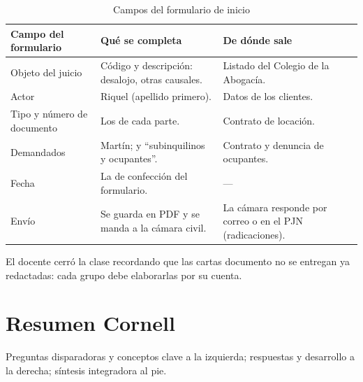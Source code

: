 \documentclass[12pt,oneside]{book}
\begin{document}
\begin{table}[H]
\centering
\caption{Campos del formulario de inicio}
\begin{tabular}{@{}p{3cm}p{5.2cm}p{5.2cm}@{}}
\toprule
\textbf{Campo del formulario} & \textbf{Qué se completa} & \textbf{De dónde sale} \\
\midrule
Objeto del juicio & Código y descripción: desalojo, otras causales. & Listado del Colegio de la Abogacía. \\
Actor & Riquel (apellido primero). & Datos de los clientes. \\
Tipo y número de documento & Los de cada parte. & Contrato de locación. \\
Demandados & Martín; y ``subinquilinos y ocupantes''. & Contrato y denuncia de ocupantes. \\
Fecha & La de confección del formulario. & --- \\
Envío & Se guarda en PDF y se manda a la cámara civil. & La cámara responde por correo o en el PJN (radicaciones). \\
\bottomrule
\end{tabular}
\end{table}

\begin{note}
El docente cerró la clase recordando que las cartas documento no se entregan ya redactadas: cada grupo debe elaborarlas por su cuenta.
\end{note}

\clearpage

\chapter{Resumen Cornell}

Preguntas disparadoras y conceptos clave a la izquierda; respuestas y desarrollo a la derecha; síntesis integradora al pie.
\end{document}
